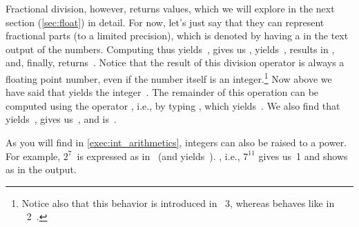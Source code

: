 Fractional division, however, returns  values, which we will explore in the next section (\cref{sec:float}) in detail.
For now, let's just say that they can represent fractional parts (to a limited precision), which is denoted by having a  in the text output of the numbers.
Computing  thus yields~,  gives us ,  yields~,  results in , and, finally,  returns~.
Notice that the result of this division operator is always a floating point number, even if the number itself is an integer.\footnote{%
Notice also that this behavior is introduced in \python~3, whereas \pythonilIdx{/} behaves like \pythonilIdx{//} in \python~2~\cite{PEP238}.}%
%
%
%
Now above we have said that  yields the integer~.
The remainder of this operation can be computed using the  operator \expandafter\pythonilIdx{\%}, i.e., by typing , which yields~.
We also find that \expandafter{} yields~, \expandafter{} gives us~, and \expandafter{} is~.

%

As you will find in \cref{exec:int_arithmetics}, integers can also be raised to a power.
For example, $2^7$~is expressed as  in \python\ (and yields~).
, i.e., $7^{11}$ gives us~1 and shows as  in the output.


